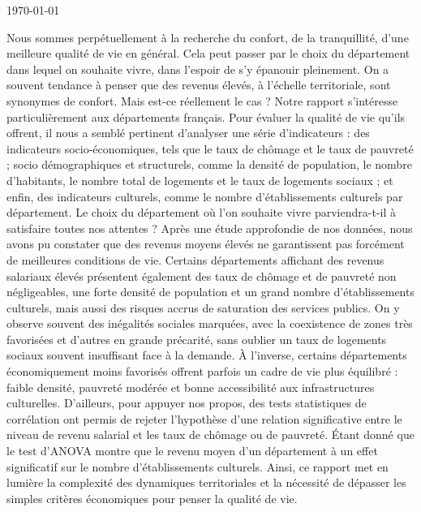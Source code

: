 \documentclass[mstat,12pt]{unswthesis}
\begin{document}
{\bigskip\bigskip\bigskip\noindent} \today




Nous sommes perpétuellement à la recherche du confort, de la
tranquillité, d'une meilleure qualité de vie en général. Cela peut
passer par le choix du département dans lequel on souhaite vivre, dans
l'espoir de s'y épanouir pleinement. On a souvent tendance à penser que
des revenus élevés, à l'échelle territoriale, sont synonymes de confort.
Mais est-ce réellement le cas ? \newline Notre rapport s'intéresse
particulièrement aux départements français. Pour évaluer la qualité de
vie qu'ils offrent, il nous a semblé pertinent d'analyser une série
d'indicateurs : des indicateurs socio-économiques, tels que le taux de
chômage et le taux de pauvreté ; socio démographiques et structurels,
comme la densité de population, le nombre d'habitants, le nombre total
de logements et le taux de logements sociaux ; et enfin, des indicateurs
culturels, comme le nombre d'établissements culturels par département.
\newline Le choix du département où l'on souhaite vivre parviendra-t-il
à satisfaire toutes nos attentes ? Après une étude approfondie de nos
données, nous avons pu constater que des revenus moyens élevés ne
garantissent pas forcément de meilleures conditions de vie. Certains
départements affichant des revenus salariaux élevés présentent également
des taux de chômage et de pauvreté non négligeables, une forte densité
de population et un grand nombre d'établissements culturels, mais aussi
des risques accrus de saturation des services publics. On y observe
souvent des inégalités sociales marquées, avec la coexistence de zones
très favorisées et d'autres en grande précarité, sans oublier un taux de
logements sociaux souvent insuffisant face à la demande. \newline À
l'inverse, certains départements économiquement moins favorisés offrent
parfois un cadre de vie plus équilibré : faible densité, pauvreté
modérée et bonne accessibilité aux infrastructures culturelles.
\newline D'ailleurs, pour appuyer nos propos, des tests statistiques de
corrélation ont permis de rejeter l'hypothèse d'une relation
significative entre le niveau de revenu salarial et les taux de chômage
ou de pauvreté. \newline Étant donné que le test d'ANOVA montre que le
revenu moyen d'un département à un effet significatif sur le nombre
d'établissements culturels. \newline Ainsi, ce rapport met en lumière la
complexité des dynamiques territoriales et la nécessité de dépasser les
simples critères économiques pour penser la qualité de vie.
\end{document}
